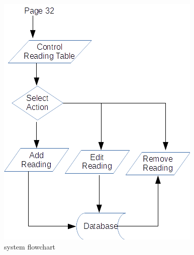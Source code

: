 \begin{figure}[H]
\includegraphics{./design/flowchart 6.png}
\caption{system flowchart}
\end{figure}

